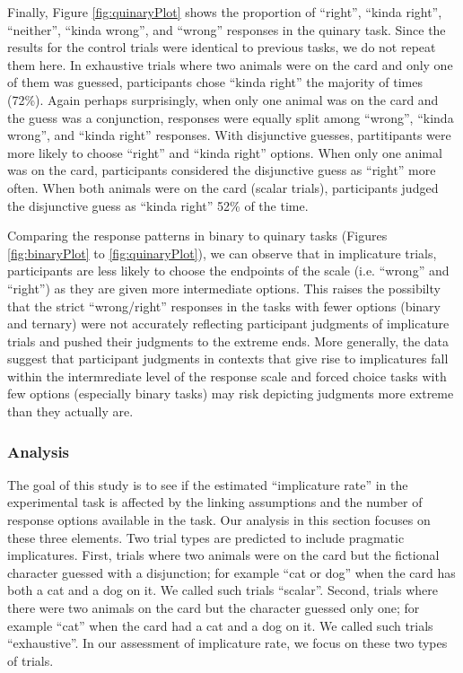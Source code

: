 \documentclass[floatsintext,man]{apa6}
\theoremstyle{definition}
\theoremstyle{definition}
\theoremstyle{definition}
\theoremstyle{remark}
\begin{document}
Finally, Figure \ref{fig:quinaryPlot} shows the proportion of
\enquote{right}, \enquote{kinda right}, \enquote{neither},
\enquote{kinda wrong}, and \enquote{wrong} responses in the quinary
task. Since the results for the control trials were identical to
previous tasks, we do not repeat them here. In exhaustive trials where
two animals were on the card and only one of them was guessed,
participants chose \enquote{kinda right} the majority of times (72\%).
Again perhaps surprisingly, when only one animal was on the card and the
guess was a conjunction, responses were equally split among
\enquote{wrong}, \enquote{kinda wrong}, and \enquote{kinda right}
responses. With disjunctive guesses, partitipants were more likely to
choose \enquote{right} and \enquote{kinda right} options. When only one
animal was on the card, participants considered the disjunctive guess as
\enquote{right} more often. When both animals were on the card (scalar
trials), participants judged the disjunctive guess as \enquote{kinda
right} 52\% of the time.

Comparing the response patterns in binary to quinary tasks (Figures
\ref{fig:binaryPlot} to \ref{fig:quinaryPlot}), we can observe that in
implicature trials, participants are less likely to choose the endpoints
of the scale (i.e. \enquote{wrong} and \enquote{right}) as they are
given more intermediate options. This raises the possibilty that the
strict \enquote{wrong/right} responses in the tasks with fewer options
(binary and ternary) were not accurately reflecting participant
judgments of implicature trials and pushed their judgments to the
extreme ends. More generally, the data suggest that participant
judgments in contexts that give rise to implicatures fall within the
intermrediate level of the response scale and forced choice tasks with
few options (especially binary tasks) may risk depicting judgments more
extreme than they actually are.

\subsubsection{Analysis}\label{analysis}

The goal of this study is to see if the estimated \enquote{implicature
rate} in the experimental task is affected by the linking assumptions
and the number of response options available in the task. Our analysis
in this section focuses on these three elements. Two trial types are
predicted to include pragmatic implicatures. First, trials where two
animals were on the card but the fictional character guessed with a
disjunction; for example \enquote{cat or dog} when the card has both a
cat and a dog on it. We called such trials \enquote{scalar}. Second,
trials where there were two animals on the card but the character
guessed only one; for example \enquote{cat} when the card had a cat and
a dog on it. We called such trials \enquote{exhaustive}. In our
assessment of implicature rate, we focus on these two types of trials.
\end{document}

